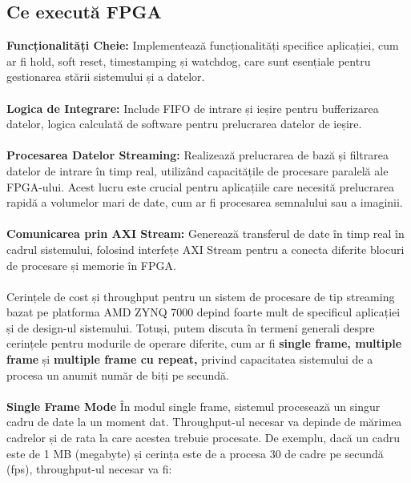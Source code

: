\documentclass[12pt]{article}
\begin{document}
\subsection{Ce execută FPGA}
\hspace*{1cm}\textbf{Funcționalități Cheie:} Implementează funcționalități specifice aplicației, cum ar fi hold, soft reset, timestamping și watchdog, care sunt esențiale pentru gestionarea stării sistemului și a datelor.\\\\
\hspace*{1cm}\textbf{Logica de Integrare:} Include FIFO de intrare și ieșire pentru bufferizarea datelor, logica calculată de software pentru prelucrarea datelor de ieșire.\\\\
\hspace*{1cm}\textbf{Procesarea Datelor Streaming:} Realizează prelucrarea de bază și filtrarea datelor de intrare în timp real, utilizând capacitățile de procesare paralelă ale FPGA-ului. Acest lucru este crucial pentru aplicațiile care necesită prelucrarea rapidă a volumelor mari de date, cum ar fi procesarea semnalului sau a imaginii.\\\\
\hspace*{1cm}\textbf{Comunicarea prin AXI Stream:} Generează transferul de date în timp real în cadrul sistemului, folosind interfețe AXI Stream pentru a conecta diferite blocuri de procesare și memorie în FPGA.\\\\
\hspace*{1cm}Cerințele de cost și throughput pentru un sistem de procesare de tip streaming bazat pe platforma AMD ZYNQ 7000 depind foarte mult de specificul aplicației și de design-ul sistemului. Totuși, putem discuta în termeni generali despre cerințele pentru modurile de operare diferite, cum ar fi \textbf{single frame, multiple frame} și \textbf{multiple frame cu repeat,} privind capacitatea sistemului de a procesa un anumit număr de biți pe secundă.\\\\
\hspace*{1cm}\textbf{Single Frame Mode}
În modul single frame, sistemul procesează un singur cadru de date la un moment dat. Throughput-ul necesar va depinde de mărimea cadrelor și de rata la care acestea trebuie procesate. De exemplu, dacă un cadru este de 1 MB (megabyte) și cerința este de a procesa 30 de cadre pe secundă (fps), throughput-ul necesar va fi:
\end{document}
